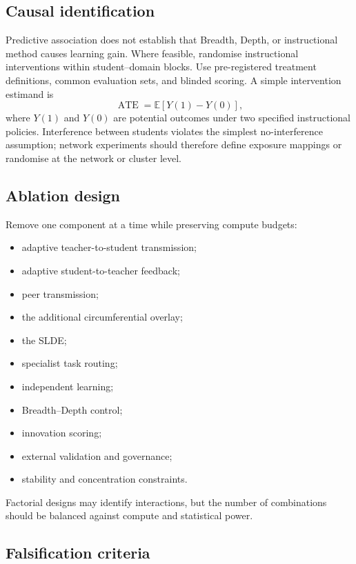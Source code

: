 \documentclass[11pt,a4paper]{article}
\begin{document}
\subsection{Causal identification}

Predictive association does not establish that Breadth, Depth, or instructional method causes learning gain. Where feasible, randomise instructional interventions within student--domain blocks. Use pre-registered treatment definitions, common evaluation sets, and blinded scoring. A simple intervention estimand is
\begin{equation}
\operatorname{ATE}
=
\mathbb E[Y(1)-Y(0)],
\end{equation}
where \(Y(1)\) and \(Y(0)\) are potential outcomes under two specified instructional policies. Interference between students violates the simplest no-interference assumption; network experiments should therefore define exposure mappings or randomise at the network or cluster level.

\subsection{Ablation design}

Remove one component at a time while preserving compute budgets:
\begin{itemize}
\item adaptive teacher-to-student transmission;
\item adaptive student-to-teacher feedback;
\item peer transmission;
\item the additional circumferential overlay;
\item the SLDE;
\item specialist task routing;
\item independent learning;
\item Breadth--Depth control;
\item innovation scoring;
\item external validation and governance;
\item stability and concentration constraints.
\end{itemize}
Factorial designs may identify interactions, but the number of combinations should be balanced against compute and statistical power.

\subsection{Falsification criteria}
\end{document}

